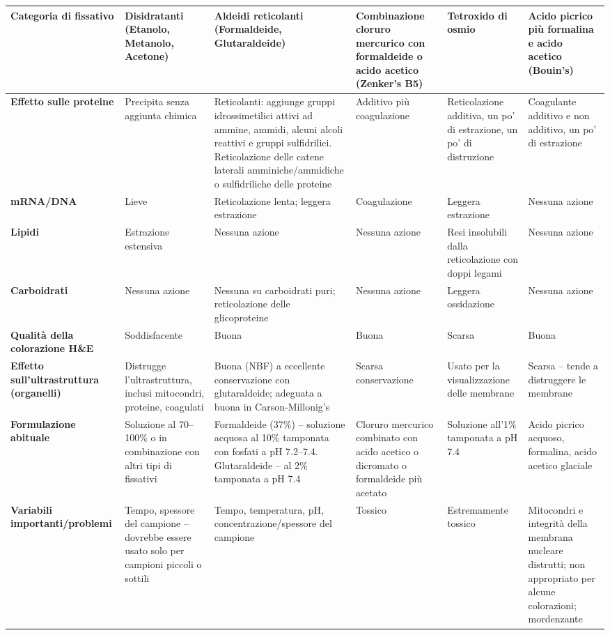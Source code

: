 \tiny
\begin{longtable}{|p{3.5cm}|p{3cm}|p{3.5cm}|p{3cm}|p{3cm}|p{3.5cm}|}
\hline
\textbf{Categoria di fissativo} & \textbf{Disidratanti} (Etanolo, Metanolo, Acetone) & \textbf{Aldeidi reticolanti} (Formaldeide, Glutaraldeide) & \textbf{Combinazione cloruro mercurico con formaldeide o acido acetico} (Zenker’s B5) & \textbf{Tetroxido di osmio} & \textbf{Acido picrico più formalina e acido acetico} (Bouin's) \\ \hline
\textbf{Effetto sulle proteine} & Precipita senza aggiunta chimica & Reticolanti: aggiunge gruppi idrossimetilici attivi ad ammine, ammidi, alcuni alcoli reattivi e gruppi sulfidrilici. Reticolazione delle catene laterali amminiche/ammidiche o sulfidriliche delle proteine & Additivo più coagulazione & Reticolazione additiva, un po' di estrazione, un po' di distruzione & Coagulante additivo e non additivo, un po' di estrazione \\ \hline
\textbf{mRNA/DNA} & Lieve & Reticolazione lenta; leggera estrazione & Coagulazione & Leggera estrazione & Nessuna azione \\ \hline
\textbf{Lipidi} & Estrazione estensiva & Nessuna azione & Nessuna azione & Resi insolubili dalla reticolazione con doppi legami & Nessuna azione \\ \hline
\textbf{Carboidrati} & Nessuna azione & Nessuna su carboidrati puri; reticolazione delle glicoproteine & Nessuna azione & Leggera ossidazione & Nessuna azione \\ \hline
\textbf{Qualità della colorazione H\&E} & Soddisfacente & Buona & Buona & Scarsa & Buona \\ \hline
\textbf{Effetto sull'ultrastruttura (organelli)} & Distrugge l'ultrastruttura, inclusi mitocondri, proteine, coagulati & Buona (NBF) a eccellente conservazione con glutaraldeide; adeguata a buona in Carson-Millonig's & Scarsa conservazione & Usato per la visualizzazione delle membrane & Scarsa – tende a distruggere le membrane \\ \hline
\textbf{Formulazione abituale} & Soluzione al 70–100\% o in combinazione con altri tipi di fissativi & Formaldeide (37\%) – soluzione acquosa al 10\% tamponata con fosfati a pH 7.2–7.4. Glutaraldeide – al 2\% tamponata a pH 7.4 & Cloruro mercurico combinato con acido acetico o dicromato o formaldeide più acetato & Soluzione all'1\% tamponata a pH 7.4 & Acido picrico acquoso, formalina, acido acetico glaciale \\ \hline
\textbf{Variabili importanti/problemi} & Tempo, spessore del campione – dovrebbe essere usato solo per campioni piccoli o sottili & Tempo, temperatura, pH, concentrazione/spessore del campione & Tossico & Estremamente tossico & Mitocondri e integrità della membrana nucleare distrutti; non appropriato per alcune colorazioni; mordenzante \\ \hline

\end{longtable}
